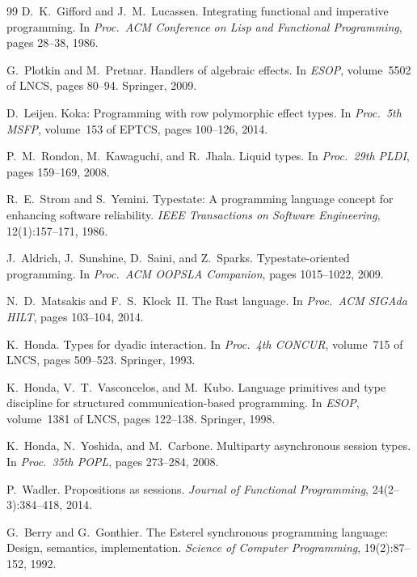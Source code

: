 \documentclass[11pt,a4paper]{article}
\begin{document}
\begin{thebibliography}{99}
D.~K.~Gifford and J.~M.~Lucassen.
\newblock Integrating functional and imperative programming.
\newblock In \emph{Proc.\ ACM Conference on Lisp and Functional Programming},
  pages 28--38, 1986.

G.~Plotkin and M.~Pretnar.
\newblock Handlers of algebraic effects.
\newblock In \emph{ESOP}, volume~5502 of LNCS, pages 80--94. Springer, 2009.

D.~Leijen.
\newblock Koka: Programming with row polymorphic effect types.
\newblock In \emph{Proc.\ 5th MSFP}, volume~153 of EPTCS, pages 100--126,
  2014.

P.~M.~Rondon, M.~Kawaguchi, and R.~Jhala.
\newblock Liquid types.
\newblock In \emph{Proc.\ 29th PLDI}, pages 159--169, 2008.

R.~E.~Strom and S.~Yemini.
\newblock Typestate: A programming language concept for enhancing software
  reliability.
\newblock \emph{IEEE Transactions on Software Engineering}, 12(1):157--171,
  1986.

J.~Aldrich, J.~Sunshine, D.~Saini, and Z.~Sparks.
\newblock Typestate-oriented programming.
\newblock In \emph{Proc.\ ACM OOPSLA Companion}, pages 1015--1022, 2009.

N.~D.~Matsakis and F.~S.~Klock~II.
\newblock The Rust language.
\newblock In \emph{Proc.\ ACM SIGAda HILT}, pages 103--104, 2014.

K.~Honda.
\newblock Types for dyadic interaction.
\newblock In \emph{Proc.\ 4th CONCUR}, volume~715 of LNCS, pages 509--523.
  Springer, 1993.

K.~Honda, V.~T.~Vasconcelos, and M.~Kubo.
\newblock Language primitives and type discipline for structured
  communication-based programming.
\newblock In \emph{ESOP}, volume~1381 of LNCS, pages 122--138. Springer, 1998.

K.~Honda, N.~Yoshida, and M.~Carbone.
\newblock Multiparty asynchronous session types.
\newblock In \emph{Proc.\ 35th POPL}, pages 273--284, 2008.

P.~Wadler.
\newblock Propositions as sessions.
\newblock \emph{Journal of Functional Programming}, 24(2--3):384--418, 2014.

G.~Berry and G.~Gonthier.
\newblock The Esterel synchronous programming language: Design, semantics,
  implementation.
\newblock \emph{Science of Computer Programming}, 19(2):87--152, 1992.


\end{thebibliography}
\end{document}
